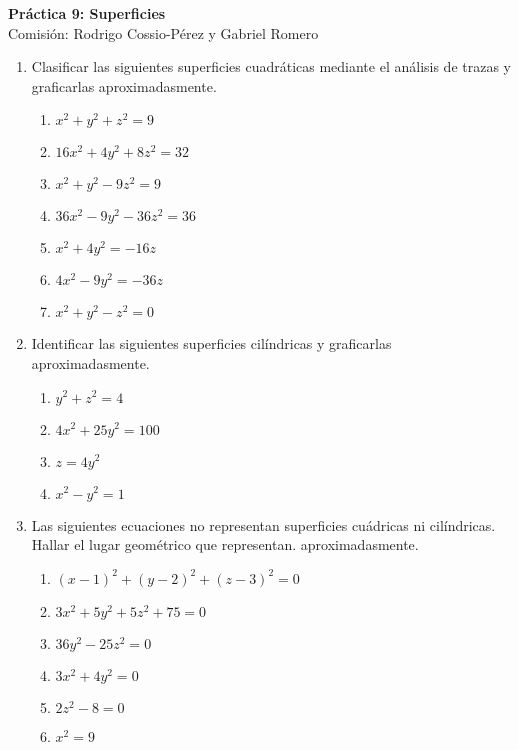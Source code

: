 \documentclass[a4paper]{article}
\newcommand{\exercise}{\item}
\begin{document}
\noindent \hrulefill 
\vspace{-7pt}
\begin{center} 
	\textbf{ Práctica 9: Superficies } \\
	Comisión: Rodrigo Cossio-Pérez y Gabriel Romero
\end{center}
\vspace{-10pt}
\hrulefill


\begin{enumerate}

	\exercise Clasificar las siguientes superficies cuadráticas mediante el análisis de trazas y graficarlas aproximadasmente.
	\begin{multicols}{2}
	\begin{enumerate} [label=(\alph*)]
		
		\item $x^2+y^2+z^2=9$
		\item $16x^2+4y^2+8z^2=32$
		\item $x^2+y^2-9z^2=9$
		\item $36x^2-9y^2-36z^2=36$
		\item $x^2+4y^2=-16z$
		\item $4x^2-9y^2=-36z$
		\item $x^2+y^2-z^2=0$

	\end{enumerate}
	\end{multicols}


	\exercise Identificar las siguientes superficies cilíndricas y graficarlas aproximadasmente.
	\begin{multicols}{2}
	\begin{enumerate} [label=(\alph*)]
		
		\item $y^2+z^2=4$
		\item $4x^2+25y^2=100$
		\item $z=4y^2$
		\item $x^2-y^2=1$

	\end{enumerate}
	\end{multicols}

	\exercise Las siguientes ecuaciones no representan superficies cuádricas ni cilíndricas. Hallar el lugar geométrico que representan. aproximadasmente.
	\begin{multicols}{2}
	\begin{enumerate} [label=(\alph*)]
		
		\item $(x-1)^2+(y-2)^2+(z-3)^2=0$
		\item $3x^2+5y^2+5z^2+75=0$
		\item $36y^2-25z^2=0$
		\item $3x^2+4y^2=0$
		\item $2z^2-8=0$
		\item $x^2=9$


\end{enumerate}
\end{multicols}
\end{enumerate}
\end{document}
